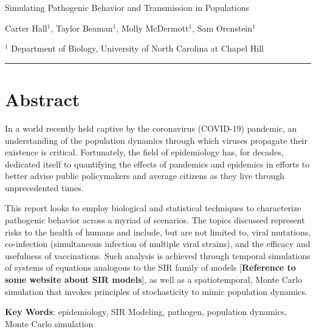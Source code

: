 \documentclass[a4paper]{article}
\begin{document}
\Large
 \begin{center}
Simulating Pathogenic Behavior and Transmission in Populations\\ 

\hspace{10pt}

\large
Carter Hall$^1$, Taylor Beaman$^1$, Molly McDermott$^1$, Sam Orenstein$^1$\\

\hspace{10pt}

\small  
$^1$ Department of Biology, University of North Carolina at Chapel Hill\\

\end{center}

\hspace{10pt}

\normalsize

\hrule

\section{Abstract}

In a world recently held captive by the coronavirus (COVID-19) pandemic, an understanding of the population dynamics through which viruses propagate their existence is critical. Fortunately, the field of epidemiology has, for decades, dedicated itself to quantifying the effects of pandemics and epidemics in efforts to better advise public policymakers and average citizens as they live through unprecedented times.

This report looks to employ biological and statistical techniques to characterize pathogenic behavior across a myriad of scenarios. The topics discussed represent risks to the health of humans and include, but are not limited to, viral mutations, co-infection (simultaneous infection of multiple viral strains), and the efficacy and usefulness of vaccinations. Such analysis is achieved through temporal simulations of systems of equations analogous to the SIR family of models [\textbf{Reference to some website about SIR models}], as well as a spatiotemporal, Monte Carlo simulation that invokes principles of stochasticity to mimic population dynamics.

\begin{center}
\textbf{Key Words}: epidemiology, SIR Modeling, pathogen, population dynamics, Monte Carlo simulation 
\end{center}
\end{document}
